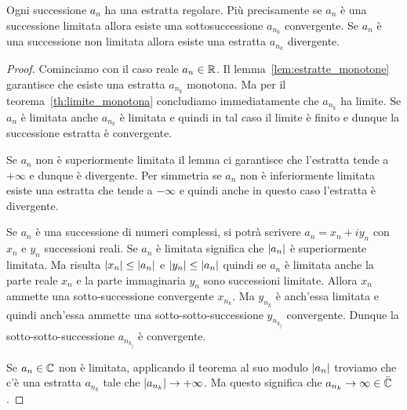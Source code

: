 \begin{theorem}\label{th:Bolzano}
\label{th:bolzano_weierstrass}%
\mymark{***}%
%
%
%
Ogni successione $a_n$ ha una estratta regolare.
Più precisamente se $a_n$ è una successione limitata
allora esiste una sottosuccessione
$a_{n_k}$ convergente.
Se $a_n$ è una successione non limitata allora 
esiste una estratta $a_{n_k}$ divergente.
\end{theorem}
%
\begin{proof}
\mymark{***}
Cominciamo con il caso reale $a_n\in {\mathbb R}$.
Il lemma~\ref{lem:estratte_monotone} garantisce 
che esiste una estratta $a_{n_k}$ monotona. 
Ma per il teorema~\ref{th:limite_monotona} concludiamo 
immediatamente che $a_{n_k}$ ha limite.
Se $a_n$ è limitata anche $a_{n_k}$ è limitata e quindi 
in tal caso il limite è finito e dunque la successione 
estratta è convergente.

Se $a_n$ non è superiormente limitata il lemma 
ci garantisce che l'estratta tende a $+\infty$ 
e dunque è divergente.
Per simmetria se $a_n$ non è inferiormente limitata 
esiste una estratta che tende a $-\infty$ e quindi anche in
questo caso l'estratta è divergente.

Se $a_n$ è una successione di numeri complessi, si potrà scrivere
$a_n = x_n + i y_n$ con
$x_n$ e $y_n$ successioni reali. Se $a_n$ è limitata significa che ${\left|a_n\right|}$
è superiormente limitata. Ma risulta ${\left|x_n\right|} \le {\left|a_n\right|}$ e
${\left|y_n\right|}\le {\left|a_n\right|}$ quindi se $a_n$ è limitata anche la parte reale
$x_n$ e la parte immaginaria $y_n$ sono successioni limitate.
Allora $x_n$ ammette una sotto-successione convergente $x_{n_k}$.
Ma $y_{n_k}$ è anch'essa limitata e quindi anch'essa ammette una
sotto-sotto-successione $y_{n_{k_j}}$ convergente.
Dunque la sotto-sotto-successione $a_{n_{k_j}}$ è convergente.

Se $a_n\in {\mathbb C}$ non è limitata, applicando il teorema al suo modulo ${\left|a_n\right|}$
troviamo che c'è una estratta $a_{n_k}$ tale che ${\left|a_{n_k}\right|}\to +\infty$.
Ma questo significa che $a_{n_k}\to \infty \in \bar {{\mathbb C}}$.
\end{proof}

